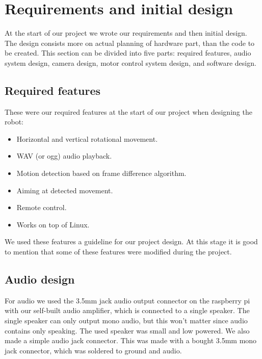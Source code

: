 \documentclass[english,11pt,twoside,a4paper]{article}
\begin{document}
\section{Requirements and initial design}

At the start of our project we wrote our requirements and then initial design. The design consists more on actual planning of hardware part, than the code to be created. This section can be divided into five parts: required features, audio system design, camera design, motor control system design, and software design.

\subsection{Required features}

These were our required features at the start of our project when designing the robot:

\begin{itemize}
  \item Horizontal and vertical rotational movement.
  \item WAV (or ogg) audio playback.
  \item Motion detection based on frame difference algorithm.
  \item Aiming at detected movement.
  \item Remote control.
  \item Works on top of Linux.
\end{itemize}

We used these features a guideline for our project design. At this stage it is good to mention that some of these features were modified during the project.

\subsection{Audio design}
\label{sec:audio_design}

For audio we used the 3.5mm jack audio output connector on the raspberry pi with our self-built audio amplifier, which is connected to a single speaker. The single speaker can only output mono audio, but this won't matter since audio contains only speaking. The used speaker was small and low powered. We also made a simple audio jack connector. This was made with a bought 3.5mm mono jack connector, which was soldered to ground and audio.
\end{document}
